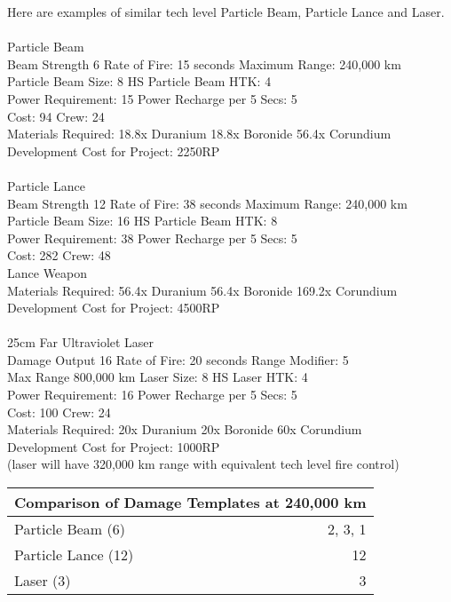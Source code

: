 \documentclass[../Aurora C# unofficial manual.tex]{subfiles}
\begin{document}
	Here are examples of similar tech level Particle Beam, Particle Lance and Laser.\\\\
	Particle Beam\\
	Beam Strength 6 \space\space\space Rate of Fire: 15 seconds \space Maximum Range: 240,000 km\\
	Particle Beam Size: 8 HS \space\space\space Particle Beam HTK: 4\\
	Power Requirement: 15 \space\space\space Power Recharge per 5 Secs: 5\\
	Cost: 94 \space\space\space Crew: 24\\
	Materials Required: 18.8x Duranium  18.8x Boronide  56.4x Corundium\\
	Development Cost for Project: 2250RP\\\\
	Particle Lance\\
	Beam Strength 12 \space\space\space Rate of Fire: 38 seconds \space\space\space Maximum Range: 240,000 km\\
	Particle Beam Size: 16 HS \space\space\space Particle Beam HTK: 8\\
	Power Requirement: 38 \space\space\space Power Recharge per 5 Secs: 5\\
	Cost: 282 \space\space\space Crew: 48\\
	Lance Weapon\\
	Materials Required: 56.4x Duranium  56.4x Boronide  169.2x Corundium\\
	Development Cost for Project: 4500RP\\\\
	25cm Far Ultraviolet Laser\\
	Damage Output 16 \space\space\space Rate of Fire: 20 seconds \space\space\space Range Modifier: 5\\
	Max Range 800,000 km \space\space\space Laser Size: 8 HS    Laser HTK: 4\\
	Power Requirement: 16 \space\space\space Power Recharge per 5 Secs: 5\\
	Cost: 100 \space\space\space Crew: 24\\
	Materials Required: 20x Duranium  20x Boronide  60x Corundium\\
	Development Cost for Project: 1000RP\\
	(laser will have 320,000 km range with equivalent tech level fire control)
	
	\begin{center}
		\begin{tabular}{|l|r|}
			\hline
			\multicolumn{2}{|c|}{\textbf{Comparison of Damage Templates at 240,000 km}} \\
			\hline
			Particle Beam (6) & 2, 3, 1 \\
			\hline
			Particle Lance (12) & 12 \\
			\hline
			Laser (3) & 3 \\
			\hline
		\end{tabular}
	\end{center}
	
\end{document}

